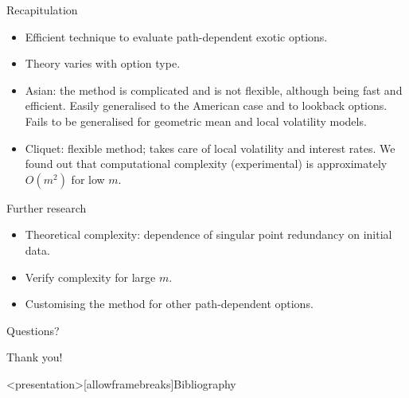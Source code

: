 \documentclass[utf8,t,xcolor=svgnames]{beamer}
\begin{document}
\begin{frame}{Recapitulation}
	\begin{itemize}
		\item Efficient technique to evaluate path-dependent exotic options.
		\item Theory varies with option type.
		\item Asian: the method is complicated and is not flexible, although being fast and efficient. Easily generalised to the American case and to lookback options. \alert{Fails to be generalised for geometric mean and local volatility models.}
		\item Cliquet: flexible method; takes care of local volatility and interest rates. \alert{We found out that computational complexity (experimental) is approximately $ O(m^2) $ for low $ m $}.
	\end{itemize}
	
	Further research
	\begin{itemize}
		\item Theoretical complexity: dependence of singular point redundancy on initial data.
		\item Verify complexity for large $ m $.
		\item Customising the method for other path-dependent options.
	\end{itemize}
\end{frame}


\begin{frame}[plain,c]
	
	\begin{center}
		{\Huge Questions?}
	\end{center}
	
	\vfill
	
	\begin{center}
		{\Huge Thank you!}
	\end{center}
	
\end{frame}



\appendix

\begin{frame}<presentation>[allowframebreaks]{Bibliography}
	\printbibliography
\end{frame}
\end{document}
